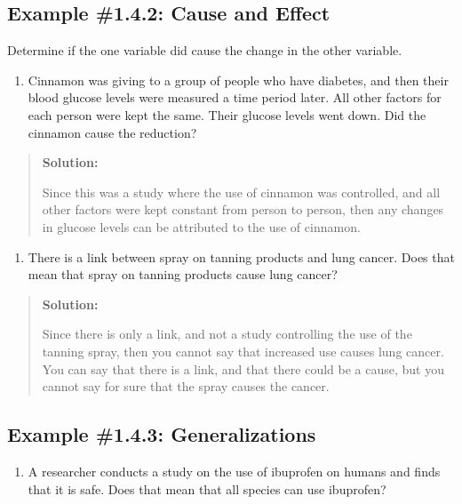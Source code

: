 \documentclass[]{book}
\providecommand{\tightlist}{%
  \setlength{\itemsep}{0pt}\setlength{\parskip}{0pt}}
\begin{document}
\hypertarget{example-1.4.2-cause-and-effect}{%
\subsection{Example \#1.4.2: Cause and Effect}\label{example-1.4.2-cause-and-effect}}

Determine if the one variable did cause the change in the other
variable.

\begin{enumerate}
\def\labelenumi{\alph{enumi}.}
\tightlist
\item
  Cinnamon was giving to a group of people who have diabetes, and then
  their blood glucose levels were measured a time period later. All
  other factors for each person were kept the same. Their glucose
  levels went down. Did the cinnamon cause the reduction?
\end{enumerate}

\begin{quote}
\textbf{Solution:}

Since this was a study where the use of cinnamon was controlled, and
all other factors were kept constant from person to person, then any
changes in glucose levels can be attributed to the use of cinnamon.
\end{quote}

\begin{enumerate}
\def\labelenumi{\alph{enumi}.}
\setcounter{enumi}{1}
\tightlist
\item
  There is a link between spray on tanning products and lung cancer.
  Does that mean that spray on tanning products cause lung cancer?
\end{enumerate}

\begin{quote}
\textbf{Solution:}

Since there is only a link, and not a study controlling the use of the
tanning spray, then you cannot say that increased use causes lung
cancer. You can say that there is a link, and that there could be a
cause, but you cannot say for sure that the spray causes the cancer.
\end{quote}

\hypertarget{example-1.4.3-generalizations}{%
\subsection{Example \#1.4.3: Generalizations}\label{example-1.4.3-generalizations}}

\begin{enumerate}
\def\labelenumi{\alph{enumi}.}
\tightlist
\item
  A researcher conducts a study on the use of ibuprofen on humans and
  finds that it is safe. Does that mean that all species can use
  ibuprofen?
\end{enumerate}
\end{document}
